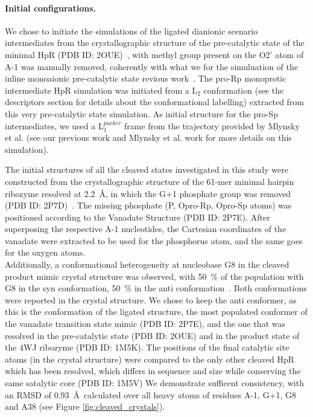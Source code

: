 \documentclass[journal=jacsat,manuscript=article]{achemso}
\begin{document}
\paragraph{Initial configurations.}
We chose to initiate the simulations of the ligated dianionic scenario intermediates 
from the crystallographic structure of the pre-catalytic state of the minimal HpR (PDB ID: 2OUE)~\cite{rupert_crystal_2001},
with methyl group present on the O2' atom of A-1 was manually removed, 
coherently with what we for the simuluation of the inline monoaionic pre-catalytic state revious work~\cite{forget2024simulation}.
The pro-Rp monoprotic intermediate HpR simulation was initiated from a L$_\mathrm{2}$ conformation 
(see the descriptors section for details about the conformational labelling) 
extracted from this very pre-catalytic state simulation.
As initial structure for the pro-Sp intermediates, 
we used a L$_\mathrm{1}^{pucker}$ frame from the trajectory provided by Mlynsky et al. (see our previous work\cite{forget2024simulation} and Mlynsky et al. work\cite{mlynsky_reactive_2015} for more details on this simulation).

The initial structures of all the cleaved states investigated in this study were constructed
from the crystallographic structure of the 61-mer minimal hairpin ribozyme resolved at 2.2~\AA,
in which the G+1 phosphate group was removed (PDB ID: 2P7D)~\cite{torelli_comparison_2007}.
The missing phosphate (P, Opro-Rp, Opro-Sp atoms) was positioned according to the Vanadate Structure (PDB ID: 2P7E).
After superposing the respective A-1 nucleotides, 
the Cartesian coordinates of the vanadate were extracted to be used for the phosphorus atom, 
and the same goes for the oxygen atoms.\\
Additionally, a conformational heterogeneity at nucleobase G8 in the cleaved product mimic crystal structure was observed, 
with 50~\% of the population with G8 in the syn conformation, 50~\% in the anti conformation~\cite{torelli_comparison_2007}.
Both conformations were reported in the crystal structure. 
We chose to keep the anti conformer, as this is the conformation of the ligated structure, 
the most populated conformer of the vanadate transition state mimic (PDB ID: 2P7E), 
and the one that was resolved in the pre-catalytic state (PDB ID: 2OUE) and in the product state of the 4WJ ribozyme (PDB ID: 1M5K).
The positions of the final catalytic site atoms (in the crystal structure) were compared to the only other cleaved HpR which has been resolved, 
which differs in sequence and size while conserving the same satalytic core (PDB ID: 1M5V)
We demonstrate sufficent consistency, with an RMSD of 0.93~\AA\ calculated over all heavy atoms of residues A-1, G+1, G8 and A38 (see Figure \ref{fig:cleaved_crystals}).
\end{document}

